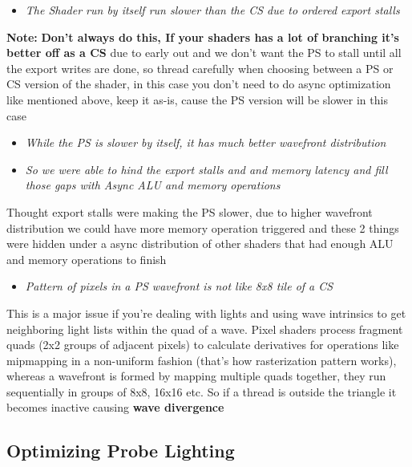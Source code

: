 \documentclass[14pt]{article}
\begin{document}
\begin{itemize}
	\item \textit{The Shader run by itself run slower than the CS due to ordered export stalls}
\end{itemize}
	
	\textbf{Note:} \textbf{Don't always do this, If your shaders has a lot of branching it's better off as a CS} due to early out and we don't want the PS to stall until all the export writes are done, so thread carefully when choosing between a PS or CS version of the shader, in this case you don't need to do async optimization like mentioned above, keep it as-is, cause the PS version will be slower in this case
		
	

\begin{itemize}
	\item \textit{While the PS is slower by itself, it has much better wavefront distribution}
	
	\item \textit{So we were able to hind the export stalls and and memory latency and fill those gaps with Async ALU and memory operations}
\end{itemize}

	Thought export stalls were making the PS slower, due to higher wavefront distribution we could have more memory operation triggered and these 2 things were hidden under a async distribution of other shaders that had enough ALU and memory operations to finish 

	
\begin{itemize}
	\item \textit{Pattern of pixels in a PS wavefront is not like 8x8 tile of a CS}
\end{itemize}
	
	This is a major issue if you're dealing with lights and using wave intrinsics to get neighboring light lists within the quad of a wave. Pixel shaders process fragment quads (2x2 groups of adjacent pixels) to calculate derivatives for operations like mipmapping in a non-uniform fashion (that's how rasterization pattern works), whereas a wavefront is formed by mapping multiple quads together, they run sequentially in groups of 8x8, 16x16 etc. So if a thread is outside the triangle it becomes inactive causing \textbf{wave divergence}
	
\subsection*{Optimizing Probe Lighting}
\end{document}
